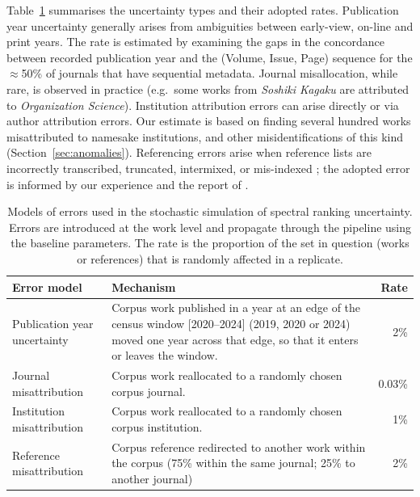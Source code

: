 Table~\ref{tab:oa_errors} summarises the uncertainty types and their adopted rates.
Publication year uncertainty generally arises from ambiguities between early-view, on-line and print years. The rate is estimated by examining the gaps in the concordance between recorded
publication year and the (Volume, Issue, Page) sequence for the $\approx$50\% of journals that have sequential metadata. Journal misallocation, while rare, is observed in practice (e.g.\ some works from
\textit{Soshiki Kagaku} are attributed to \textit{Organization Science}).
Institution attribution errors can arise directly or via author attribution errors. Our estimate is based on finding several hundred works misattributed to namesake institutions, and other misidentifications of this kind (Section~\ref{sec:anomalies}). Referencing errors arise when reference lists are incorrectly transcribed, truncated, intermixed, or mis-indexed \citep[c.f.][]{olenskyEvaluationCitationMatching2016}; the adopted error is informed by our experience and the report of \textcite{rodriguesDetectingIncoherentCitation2025}.
\begin{table}[htbp]
  \centering
  \small
  \caption{Models of errors used in the stochastic simulation of spectral ranking uncertainty.
           Errors are introduced at the work level and propagate through the pipeline using the baseline parameters. The rate is the proportion of the set in question (works or references) that is randomly affected in a replicate.}
  \label{tab:oa_errors}
  \begin{tabular}{lp{9cm}r}
    \toprule
    Error model       & Mechanism & Rate \\
    \midrule
    Publication year uncertainty
      & Corpus work published in a year at an edge of the census window
        [2020--2024] (2019, 2020 or 2024) moved one year across that edge,
        so that it enters or leaves the window.
      & 2\% \\
    Journal misattribution
      & Corpus work reallocated to a randomly chosen corpus journal.
      & 0.03\% \\
    Institution misattribution
      & Corpus work reallocated to a randomly chosen corpus institution.
      & 1\% \\
    Reference misattribution
      & Corpus reference redirected to another work within the corpus
        (75\% within the same journal; 25\% to another journal)
      & 2\% \\
    \bottomrule
  \end{tabular}
\end{table}


